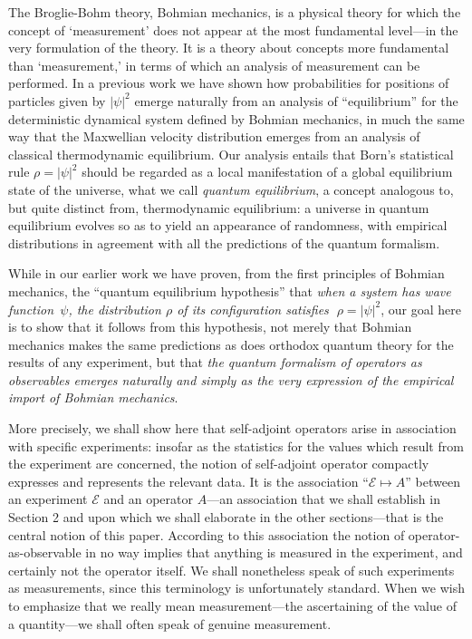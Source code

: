\documentclass[12pt]{article}
\newcommand{\sa}{self-adjoint}
\newcommand{\BM}{Bohmian mechanics}
\newcommand{\wf}{wave function}
\newcommand{\E}{\mbox{$\mathscr{E}$}}
\begin{document}
The Broglie-Bohm theory, Bohmian mechanics, is a physical theory for
which the concept of `measurement' does not appear at the most
fundamental level---in the very formulation of the theory. It is a
theory about concepts more fundamental than `measurement,' in terms of
which an analysis of measurement can be performed. In a previous work
\cite{DGZ92a} we have shown how probabilities for positions of
particles given by $|\psi|^2$ emerge naturally {}from an analysis of
``equilibrium'' for the deterministic dynamical system defined by
Bohmian mechanics, in much the same way that the Maxwellian velocity
distribution emerges {}from an analysis of classical thermodynamic
equilibrium.  Our analysis entails that Born's statistical rule
$\rho=|\psi|^{2}$ should be regarded as a local manifestation of a
global equilibrium state of the universe, what we call \emph{quantum
   equilibrium}, a concept analogous to, but quite distinct {}from,
thermodynamic equilibrium: a universe in quantum equilibrium evolves
so as to yield an appearance of randomness, with empirical
distributions in agreement with all the predictions of the quantum
formalism.

While in our earlier work we have proven, {}from the first principles
of \BM{}, the ``quantum equilibrium hypothesis'' that \emph{when a
   system has \wf\ $\psi$, the distribution $\rho$ of its configuration
   satisfies $\;\rho = |\psi|^2$}, our goal here is to show that it
follows {}from this hypothesis, not merely that \BM{} makes the same
predictions as does orthodox quantum theory for the results of any
experiment, but that \emph{the quantum formalism of operators as
   observables emerges naturally and simply as the very expression of
   the empirical import of \BM{}}.

More precisely, we shall show here that \sa{} operators arise in
association with specific experiments: insofar as the statistics for
the values which result {}from the experiment are concerned, the
notion of \sa{} operator compactly expresses and represents the
relevant data.  It is the association ``$\E\mapsto A$'' between an
experiment \E{} and an operator $A$---an association that we shall
establish in Section 2 and upon which we shall elaborate in the other
sections---that is the central notion of this paper. According to this
association the notion of operator-as-observable in no way implies
that anything is measured in the experiment, and certainly not the
operator itself.  We shall nonetheless speak of such experiments as
measurements, since this terminology is unfortunately standard. When
we wish to emphasize that we really mean measurement---the
ascertaining of the value of a quantity---we shall often speak of
genuine measurement.
\end{document}
